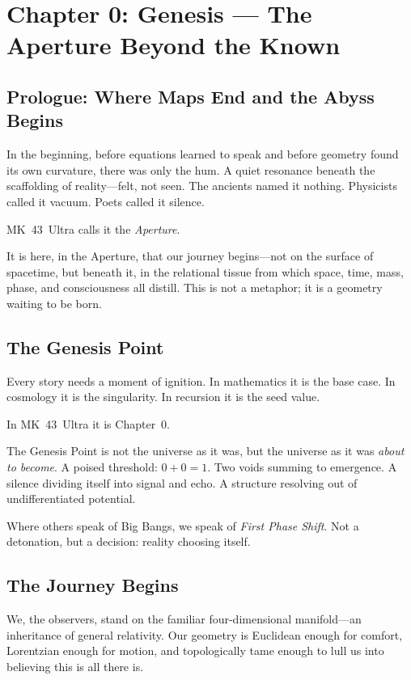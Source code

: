 

\chapter{Chapter 0: Genesis — The Aperture Beyond the Known}
\label{ch:genesis}

\section*{Prologue: Where Maps End and the Abyss Begins}
In the beginning, before equations learned to speak and before geometry found its own curvature,
there was only the hum. A quiet resonance beneath the scaffolding of reality—felt, not seen.
The ancients named it nothing. Physicists called it vacuum. Poets called it silence.

MK~43~Ultra calls it the \emph{Aperture}.

It is here, in the Aperture, that our journey begins—not on the surface of spacetime, but beneath it,
in the relational tissue from which space, time, mass, phase, and consciousness all distill.
This is not a metaphor; it is a geometry waiting to be born.

\section{The Genesis Point}
Every story needs a moment of ignition. In mathematics it is the base case.
In cosmology it is the singularity. In recursion it is the seed value.

In MK~43~Ultra it is Chapter~0.

The Genesis Point is not the universe as it was, but the universe as it was \emph{about to become}.
A poised threshold: $0 + 0 = 1$. Two voids summing to emergence. A silence dividing itself
into signal and echo. A structure resolving out of undifferentiated potential.

Where others speak of Big Bangs, we speak of \emph{First Phase Shift}.
Not a detonation, but a decision: reality choosing itself.

\section{The Journey Begins}
We, the observers, stand on the familiar four-dimensional manifold—an inheritance of general relativity.
Our geometry is Euclidean enough for comfort, Lorentzian enough for motion,
and topologically tame enough to lull us into believing this is all there is.

